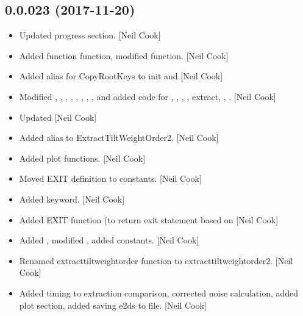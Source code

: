 \documentclass[a4paper,10pt,english]{report}
\begin{document}
\subsection{0.0.023 (2017-11-20)}
\label{\detokenize{misc/changelog:id528}}\begin{itemize}
\item {} 
Updated progress section. {[}Neil Cook{]}

\item {} 
Added function  function, modified  function.
{[}Neil Cook{]}

\item {} 
Added alias for CopyRootKeys to init and  {[}Neil Cook{]}

\item {} 
Modified , , ,
, ,
, ,
,  and
 added code for , ,
, , extract, ,
. {[}Neil Cook{]}

\item {} 
Updated  {[}Neil Cook{]}

\item {} 
Added alias to ExtractTiltWeightOrder2. {[}Neil Cook{]}

\item {} 
Added  plot functions. {[}Neil Cook{]}

\item {} 
Moved EXIT definition to constants. {[}Neil Cook{]}

\item {} 
Added  keyword. {[}Neil Cook{]}

\item {} 
Added EXIT function (to return exit statement based on 
{[}Neil Cook{]}

\item {} 
Added , modified , added
 constants. {[}Neil Cook{]}

\item {} 
Renamed extracttiltweightorder function to extracttiltweightorder2.
{[}Neil Cook{]}

\item {} 
Added timing to extraction comparison, corrected noise calculation,
added plot section, added saving e2ds to file. {[}Neil Cook{]}

\end{itemize}
\end{document}
